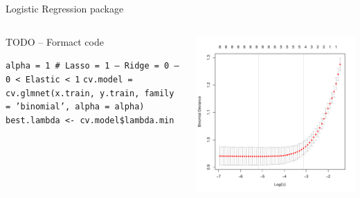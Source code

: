 
\begin{frame}{Logistic Regression package}

\begin{columns}[T]
\begin{column}{0.5\textwidth}
TODO -- Formact code

\texttt{alpha = 1   \# Lasso = 1 -- Ridge = 0 -- 0 < Elastic < 1}
\texttt{cv.model = cv.glmnet(x.train, y.train, family = 'binomial', alpha = alpha)}
\texttt{best.lambda <- cv.model\$lambda.min}
\end{column}
\begin{column}{0.5\textwidth}
\includegraphics[width=0.85\columnwidth]{./Figures/logist/cv_lambda.pdf}
\end{column}
\end{columns}

\end{frame}

